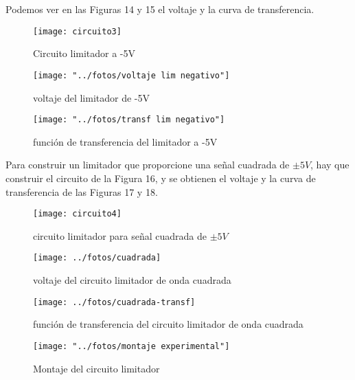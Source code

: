 \documentclass[a4paper,12pt,spanish]{article}
\begin{document}
Podemos ver en las Figuras 14 y 15 el voltaje y la curva de transferencia.

\begin{figure}[H]
	\centering
	\texttt{[image: circuito3]}
	\caption{Circuito limitador a -5V}
	\label{fig:circuito3}
\end{figure}



\begin{figure}[H]
	\centering
	\texttt{[image: "../fotos/voltaje lim negativo"]}
	\caption{voltaje del limitador de -5V}
	\label{fig:voltaje-lim-negativo}
\end{figure}

\begin{figure}[H]
	\centering
	\texttt{[image: "../fotos/transf lim negativo"]}
	\caption{función de transferencia del limitador a -5V}
	\label{fig:transf-lim-negativo}
\end{figure}

Para construir un limitador que proporcione una señal cuadrada de $\pm 5 \si{V}$, hay que construir el circuito de la Figura 16, y se obtienen el voltaje y la curva de transferencia de las Figuras 17 y 18.

\begin{figure}[H]
	\centering
	\texttt{[image: circuito4]}
	\caption{circuito limitador para señal cuadrada de $\pm 5 \si{V}$}
	\label{fig:circuito4}
\end{figure}

\begin{figure}[H]
	\centering
	\texttt{[image: ../fotos/cuadrada]}
	\caption{voltaje del circuito limitador de onda cuadrada}
	\label{fig:cuadrada}
\end{figure}

\begin{figure}[H]
	\centering
	\texttt{[image: ../fotos/cuadrada-transf]}
	\caption{función de transferencia del circuito limitador de onda cuadrada}
	\label{fig:cuadrada-transf}
\end{figure}

\begin{figure}[H]
	\centering
	\texttt{[image: "../fotos/montaje experimental"]}
	\caption{Montaje del circuito limitador}
	\label{fig:montaje-experimental}
\end{figure}
\end{document}
